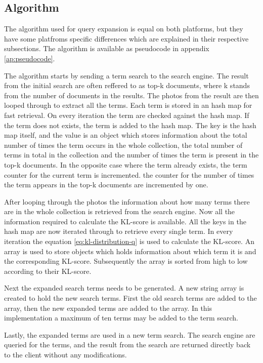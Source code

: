 \subsection{Algorithm}
\label{sec:algorithm}
The algorithm used for query expansion is equal on both platforms,
but they have some platfroms specific differences which are explained in their respective subsections.
The algorithm is available as pseudocode in appendix \ref{ap:pseudocode}.

The algorithm starts by sending a term search to the search engine.
The result from the initial search are often reffered to as top-k documents,
where k stands from the number of documents in the results.
The photos from the result are then looped through to extract all the terms.
Each term is stored in an hash map for fast retrieval.
On every iteration the term are checked against the hash map.
If the term does not exists,
the term is added to the hash map.
The key is the hash map itself,
and the value is an object which stores information about the total number of times the term occurs in the whole collection,
the total number of terms in total in the collection and the number of times the term is present in the top-k documents.
In the opposite case where the term already exists, the term counter for the current term is incremented.
the counter for the number of times the term appears in the top-k documents are incremented by one.

After looping through the photos the information about how many terms there are in the whole collection is retrieved from the search engine.
Now all the information required to calculate the KL-score is available.
All the keys in the hash map are now iterated through to retrieve every single term.
In every iteration the equation \ref{eq:kl-distribution-q} is used to calculate the KL-score.
An array is used to store objects which holds information about which term it is and the corresponding KL-score.
Subsequently the array is sorted from high to low according to their KL-score.

Next the expanded search terms needs to be generated.
A new string array is created to hold the new search terms.
First the old search terms are added to the array,
then the new expanded terms are added to the array.
In this implementation a maximum of ten terms may be added to the term search.

Lastly, the expanded terms are used in a new term search.
The search engine are queried for the terms,
and the result from the search are returned directly back to the client without any modifications.

